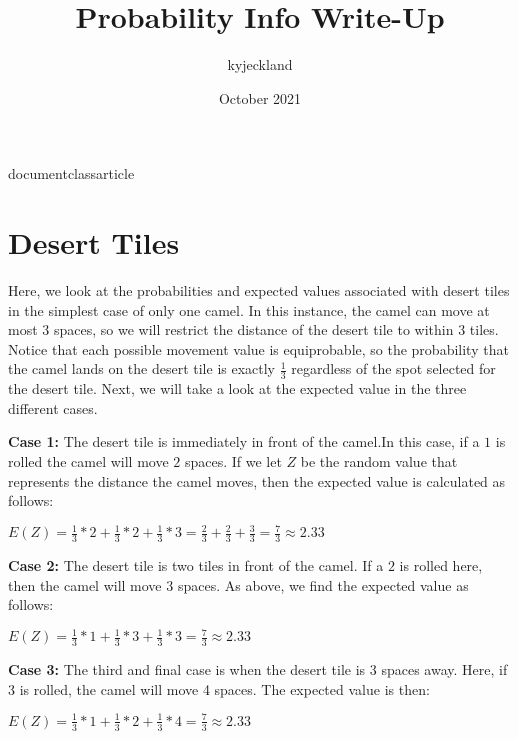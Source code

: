 documentclass{article}
\usepackage[utf8]{inputenc}

\title{Probability Info Write-Up}
\author{kyjeckland }
\date{October 2021}



\maketitle

\section{Desert Tiles}
Here, we look at the probabilities and expected values associated with desert tiles in the simplest case of only one camel. In this instance, the camel can move at most 3 spaces, so we will restrict the distance of the desert tile to within 3 tiles. Notice that each possible movement value is equiprobable, so the probability that the camel lands on the desert tile is exactly $\frac{1}{3}$ regardless of the spot selected for the desert tile. Next, we will take a look at the expected value in the three different cases.

\textbf{Case 1:} The desert tile is immediately in front of the camel.In this case, if a $1$ is rolled the camel will move $2$ spaces. If we let $Z$ be the random value that represents the distance the camel moves, then the expected value is calculated as follows:

\begin{center} $E(Z) = \frac{1}{3}*2 + \frac{1}{3}*2+\frac{1}{3}*3 = \frac{2}{3}+\frac{2}{3}+\frac{3}{3} = \frac{7}{3} \approx 2.33$
\end{center}

\textbf{Case 2:} The desert tile is two tiles in front of the camel. If a $2$ is rolled here, then the camel will move $3$ spaces. As above, we find the expected value as follows:

\begin{center} $E(Z) = \frac{1}{3}*1+\frac{1}{3}*3+\frac{1}{3}*3 = \frac{7}{3} \approx 2.33$
\end{center}

\textbf{Case 3:} The third and final case is when the desert tile is 3 spaces away. Here, if 3 is rolled, the camel will move 4 spaces. The expected value is then:
\begin{center} $E(Z) = \frac{1}{3}*1+\frac{1}{3}*2+\frac{1}{3}*4 = \frac{7}{3} \approx 2.33$
\end{center}

